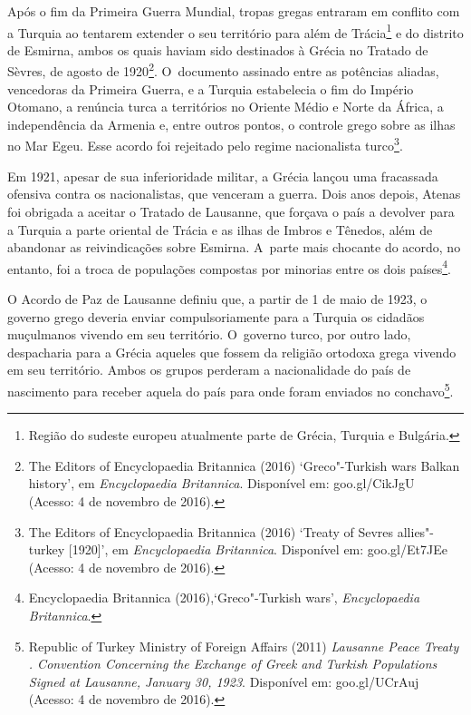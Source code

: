 Após o fim da Primeira Guerra Mundial, tropas gregas entraram em
conflito com a Turquia ao tentarem extender o seu território para além
de Trácia\footnote{ Região do sudeste europeu atualmente parte de
Grécia, Turquia e Bulgária.}  e do distrito de Esmirna, ambos os quais
haviam sido destinados à Grécia no Tratado de Sèvres, de agosto de
1920\footnote{ The Editors of Encyclopaedia Britannica (2016)
`Greco"-Turkish wars \textbar{} Balkan history', em \emph{Encyclopaedia}
\emph{Britannica}. Disponível em:
goo.gl/CikJgU
(Acesso: 4 de
novembro de 2016).}. O~documento assinado entre as potências
aliadas, vencedoras da Primeira Guerra, e a Turquia estabelecia o fim do
Império Otomano, a renúncia turca a territórios no Oriente Médio e Norte
da África, a independência da Armenia e, entre outros pontos, o controle
grego sobre as ilhas no Mar Egeu. Esse acordo foi rejeitado pelo regime
nacionalista turco\footnote{ The Editors of Encyclopaedia Britannica (2016)
`Treaty of Sevres \textbar{} allies"-turkey {[}1920{]}', em
\emph{Encyclopaedia Britannica}. Disponível em:
goo.gl/Et7JEe
(Acesso: 4 de novembro
de 2016).}.

Em 1921, apesar de sua inferioridade militar, a Grécia lançou uma
fracassada ofensiva contra os nacionalistas, que venceram a guerra. Dois
anos depois, Atenas foi obrigada a aceitar o Tratado de Lausanne, que
forçava o país a devolver para a Turquia a parte oriental de Trácia e as
ilhas de Imbros e Tênedos, além de abandonar as reivindicações sobre
Esmirna. A~parte mais chocante do acordo, no entanto, foi a troca de
populações compostas por minorias entre os dois
países\footnote{ Encyclopaedia Britannica (2016),`Greco"-Turkish
wars', \emph{Encyclopaedia} \emph{Britannica}.}.

O Acordo de Paz de Lausanne definiu que, a partir de 1 de maio de 1923,
o governo grego deveria enviar compulsoriamente para a Turquia os
cidadãos muçulmanos vivendo em seu território. O~governo turco, por
outro lado, despacharia para a Grécia aqueles que fossem da religião
ortodoxa grega vivendo em seu território. Ambos os grupos perderam a
nacionalidade do país de nascimento para receber aquela do país para
onde foram enviados no conchavo\footnote{ Republic of Turkey Ministry of Foreign Affairs
(2011) \emph{Lausanne Peace Treaty . Convention Concerning the
Exchange of Greek and Turkish Populations Signed at Lausanne, January
30, 1923}. Disponível em:
goo.gl/UCrAuj
(Acesso: 4 de novembro de 2016).}.

